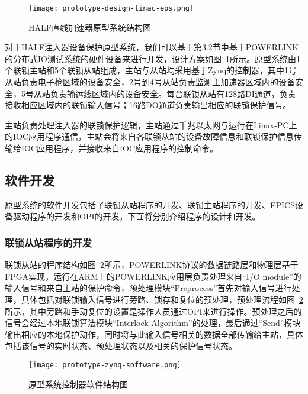 \begin{figure}[!htb]
	\centering
	\texttt{[image: prototype-design-linac-eps.png]}
	\caption{HALF直线加速器原型系统结构图}
	\label{fig:prototype-design-linac-eps}
\end{figure}

对于HALF注入器设备保护原型系统，我们可以基于第3.2节中基于POWERLINK的分布式IO测试系统的硬件设备来进行开发，设计方案如图~\ref{fig:prototype-design-linac-eps}所示。原型系统由1个联锁主站和5个联锁从站组成，主站与从站均采用基于Zynq的控制器，其中1号从站负责电子枪区域的设备安全，2号到4号从站负责监测主加速器区域内的设备安全，5号从站负责输运线区域内的设备安全。每台联锁从站有128路DI通道，负责接收相应区域内的联锁输入信号；16路DO通道负责输出相应的联锁保护信号。

主站负责处理注入器的联锁保护逻辑，主站通过千兆以太网与运行在Linux-PC上的IOC应用程序通信，主站会将来自各联锁从站的设备故障信息和联锁保护信息传输给IOC应用程序，并接收来自IOC应用程序的控制命令。

\subsection{软件开发}

原型系统的软件开发包括了联锁从站程序的开发、联锁主站程序的开发、EPICS设备驱动程序的开发和OPI的开发，下面将分别介绍程序的设计和开发。

\subsubsection{联锁从站程序的开发}

联锁从站的程序结构如图~\ref{fig:prototype-zynq-software}所示，POWERLINK协议的数据链路层和物理层基于FPGA实现，运行在ARM上的POWERLINK应用层负责处理来自“I/O module”的输入信号和来自主站的保护命令，预处理模块“Preprocess”首先对输入信号进行处理，具体包括对联锁输入信号进行旁路、锁存和复位的预处理，预处理流程如图~\ref{fig:prototype-zynq-software}所示，其中旁路和手动复位的设置是操作人员通过OPI来进行操作。预处理之后的信号会经过本地联锁算法模块“Interlock Algorithm”的处理，最后通过“Send”模块输出相应的本地保护动作，同时将与此输入信号相关的数据全部传输给主站，具体包括该信号的实时状态、预处理状态以及相关的保护信号状态。


\begin{figure}[!htb]
	\centering
	\texttt{[image: prototype-zynq-software.png]}
	\caption{原型系统控制器软件结构图}
	\label{fig:prototype-zynq-software}
\end{figure}


